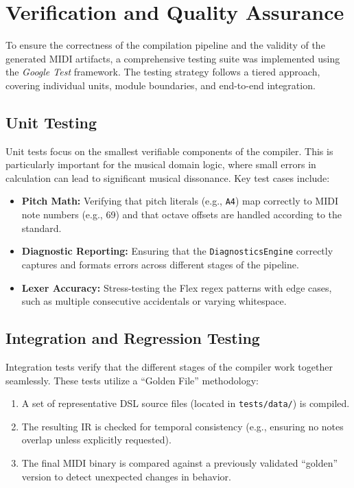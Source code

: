 \section{Verification and Quality Assurance}\label{sec:implementation-verification}

To ensure the correctness of the compilation pipeline and the validity of the generated MIDI artifacts, a comprehensive
testing suite was implemented using the \textit{Google Test} framework.
The testing strategy follows a tiered approach, covering individual units, module boundaries, and end-to-end
integration.

\subsection{Unit Testing}\label{subsec:unit-testing}

Unit tests focus on the smallest verifiable components of the compiler.
This is particularly important for the musical domain logic, where small errors in calculation can lead to significant
musical dissonance.
Key test cases include:
\begin{itemize}
  \item \textbf{Pitch Math:} Verifying that pitch literals (e.g., \texttt{A4}) map correctly to MIDI note numbers (e.g.,
    69) and that octave offsets are handled according to the standard.
  \item \textbf{Diagnostic Reporting:} Ensuring that the \texttt{DiagnosticsEngine} correctly captures and formats
    errors across different stages of the pipeline.
  \item \textbf{Lexer Accuracy:} Stress-testing the Flex regex patterns with edge cases, such as multiple consecutive
    accidentals or varying whitespace.
\end{itemize}

\subsection{Integration and Regression Testing}\label{subsec:integration-and-regression-testing}

Integration tests verify that the different stages of the compiler work together seamlessly.
These tests utilize a ``Golden File'' methodology:
\begin{enumerate}
  \item A set of representative DSL source files (located in \texttt{tests/data/}) is compiled.
  \item The resulting IR is checked for temporal consistency (e.g., ensuring no notes overlap unless explicitly
    requested).
  \item The final MIDI binary is compared against a previously validated ``golden'' version to detect unexpected changes
    in behavior.
\end{enumerate}

